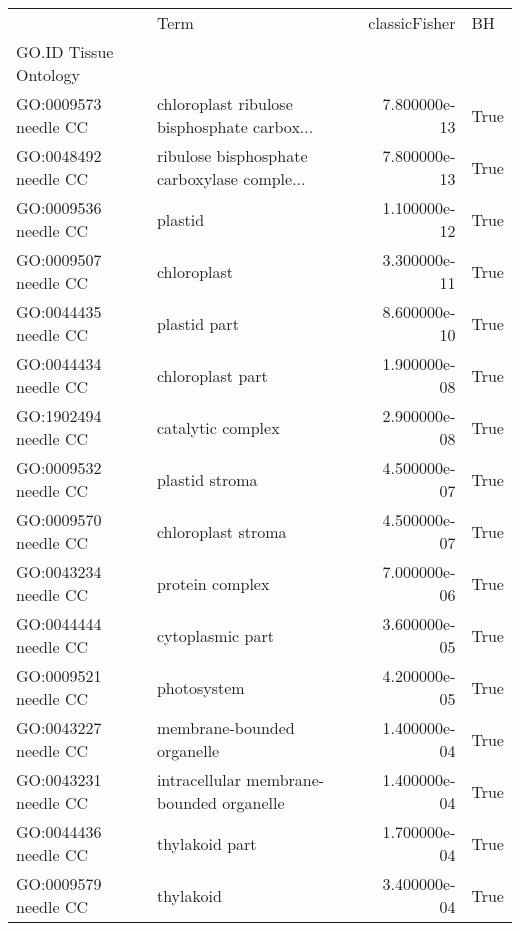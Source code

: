 \begin{tabular}{llrl}
\toprule
{} &                                         Term &  classicFisher &     BH \\
GO.ID      Tissue Ontology &                                              &                &        \\
GO:0009573 needle CC       &  chloroplast ribulose bisphosphate carbox... &   7.800000e-13 &   True \\
\midrule
GO:0048492 needle CC       &  ribulose bisphosphate carboxylase comple... &   7.800000e-13 &   True \\
GO:0009536 needle CC       &                                      plastid &   1.100000e-12 &   True \\
GO:0009507 needle CC       &                                  chloroplast &   3.300000e-11 &   True \\
GO:0044435 needle CC       &                                 plastid part &   8.600000e-10 &   True \\
GO:0044434 needle CC       &                             chloroplast part &   1.900000e-08 &   True \\
GO:1902494 needle CC       &                            catalytic complex &   2.900000e-08 &   True \\
GO:0009532 needle CC       &                               plastid stroma &   4.500000e-07 &   True \\
GO:0009570 needle CC       &                           chloroplast stroma &   4.500000e-07 &   True \\
GO:0043234 needle CC       &                              protein complex &   7.000000e-06 &   True \\
GO:0044444 needle CC       &                             cytoplasmic part &   3.600000e-05 &   True \\
GO:0009521 needle CC       &                                  photosystem &   4.200000e-05 &   True \\
GO:0043227 needle CC       &                   membrane-bounded organelle &   1.400000e-04 &   True \\
GO:0043231 needle CC       &     intracellular membrane-bounded organelle &   1.400000e-04 &   True \\
GO:0044436 needle CC       &                               thylakoid part &   1.700000e-04 &   True \\
GO:0009579 needle CC       &                                    thylakoid &   3.400000e-04 &   True \\

\end{tabular}
